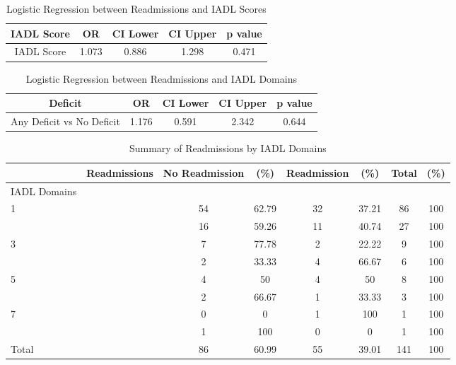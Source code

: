 \documentclass[12pt,]{article}
\begin{document}
\pagebreak

\begin{table}[!h]

\caption{\label{tab:unnamed-chunk-13}Logistic Regression between Readmissions and IADL Scores}
\centering
\begin{tabular}{ccccc}
\toprule
IADL Score & OR & CI Lower & CI Upper & p value\\
\midrule
\rowcolor{white}  IADL Score & 1.073 & 0.886 & 1.298 & 0.471\\
\bottomrule
\end{tabular}
\end{table}

\begin{table}[!h]

\caption{\label{tab:unnamed-chunk-13}Logistic Regression between Readmissions and IADL Domains}
\centering
\begin{tabular}{ccccc}
\toprule
Deficit & OR & CI Lower & CI Upper & p value\\
\midrule
\rowcolor{white}  Any Deficit vs No Deficit & 1.176 & 0.591 & 2.342 & 0.644\\
\bottomrule
\end{tabular}
\end{table}

\begin{table}[!h]

\caption{\label{tab:unnamed-chunk-13}Summary of Readmissions by IADL Domains}
\centering
\begin{tabular}{>{\centering\arraybackslash}p{5cm}ccccccc}
\toprule
  & Readmissions & No Readmission & (\%) & Readmission & (\%) & Total & (\%)\\
\midrule
IADL Domains &  &  &  &  &  &  & \\
\rowcolor[HTML]{E3E5E7}  1 &  & 54 & 62.79 & 32 & 37.21 & 86 & 100\\
2 &  & 16 & 59.26 & 11 & 40.74 & 27 & 100\\
\rowcolor[HTML]{E3E5E7}  3 &  & 7 & 77.78 & 2 & 22.22 & 9 & 100\\
4 &  & 2 & 33.33 & 4 & 66.67 & 6 & 100\\
\addlinespace
\rowcolor[HTML]{E3E5E7}  5 &  & 4 & 50 & 4 & 50 & 8 & 100\\
6 &  & 2 & 66.67 & 1 & 33.33 & 3 & 100\\
\rowcolor[HTML]{E3E5E7}  7 &  & 0 & 0 & 1 & 100 & 1 & 100\\
8 &  & 1 & 100 & 0 & 0 & 1 & 100\\
\rowcolor[HTML]{E3E5E7}  Total &  & 86 & 60.99 & 55 & 39.01 & 141 & 100\\
\bottomrule
\end{tabular}
\end{table}
\end{document}

